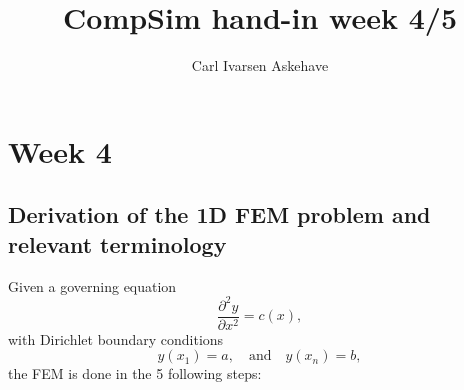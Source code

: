 \documentclass[acmtog]{acmart}
\begin{document}
\title{CompSim hand-in week 4/5}
\author{Carl Ivarsen Askehave}

\maketitle
\thispagestyle{empty}
\section{Week 4}
\subsection{Derivation of the 1D FEM problem and relevant terminology}
Given a governing equation
%
\begin{equation}
  \frac{ \partial^{2} y }{ \partial x^{2} } = c(x),
\end{equation}
%
with Dirichlet boundary conditions
%
\begin{equation}
  y(x_1) = a, \quad \text{and} \quad y(x_n) = b,
\end{equation}
%
the FEM is done in the 5 following steps:
\end{document}
